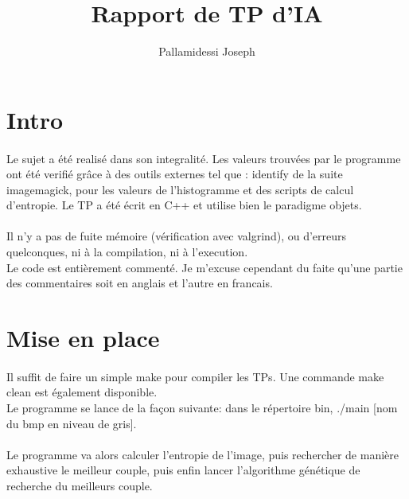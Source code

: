 \documentclass{article}
\begin{document}
\title{Rapport de TP d'IA}
\author{Pallamidessi Joseph 
}
\maketitle
\newpage

\section{Intro} %
\label{sec:Intro}
\paragraph{} %
\label{par:}

Le sujet a été realisé dans son integralité. Les valeurs trouvées par le programme ont été
verifié grâce à des outils externes tel que : identify de la suite imagemagick, pour les
valeurs de l'histogramme et des scripts de calcul d'entropie. Le TP a été écrit en C++ et
utilise bien le paradigme objets.

\paragraph{} %
\label{par:}
Il n'y a pas de fuite mémoire (vérification avec valgrind), ou d'erreurs quelconques, ni à la
compilation, ni à l'execution.\\
Le code est entièrement commenté. Je m'excuse cependant du faite qu'une partie des
commentaires soit en anglais et l'autre en francais.

\section{Mise en place} %
\label{sec:Mise en place}
\paragraph{} %
\label{par:}
Il suffit de faire un simple make pour compiler les TPs. Une commande make clean est
également disponible.\\
Le programme se lance de la façon suivante: dans le répertoire bin, ./main [nom du bmp en
niveau de gris].\\
\paragraph{} %
\label{par:}
Le programme va alors calculer l'entropie de l'image, puis rechercher de manière exhaustive
le meilleur couple, puis enfin lancer l'algorithme génétique de recherche du meilleurs
couple.
\end{document}
